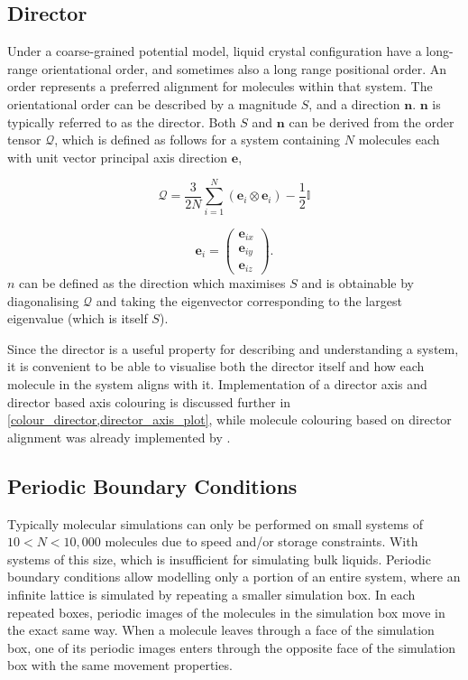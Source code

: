 \subsection{Director}
\label{director_explain}
Under a coarse-grained potential model, liquid crystal configuration have a long-range orientational order, and sometimes also a long range positional order. An order represents a preferred alignment for molecules within that system\cite{dong1997orientational}. The orientational order can be described by a magnitude $S$, and a direction $\mathbf{n}$. $\mathbf{n}$ is typically referred to as the director. Both $S$ and $\mathbf{n}$ can be derived from the order tensor $\mathcal{Q}$, which is defined as follows for a system containing $N$ molecules each with unit vector principal axis direction $\mathbf{e}$,

\begin{equation}
\mathcal{Q}=
\frac{3}{2N}
\sum_{i=1}^{N}
(\mathbf{e}_i
\otimes
\mathbf{e}_i)
-\frac{1}{2}\mathbb{I}
\end{equation}

\begin{equation}
\mathbf{e}_i=\begin{pmatrix}
  \mathbf{e}_{ix}\\
  \mathbf{e}_{iy}\\
  \mathbf{e}_{iz}
\end{pmatrix}.
\label{order_tensor_e}
\end{equation}
$n$ can be defined as the direction which maximises $S$ and is obtainable by diagonalising $\mathcal{Q}$ and taking the eigenvector corresponding to the largest eigenvalue (which is itself $S$).

Since the director is a useful property for describing and understanding a system, it is convenient to be able to visualise both the director itself and how each molecule in the system aligns with it. Implementation of a director axis and director based axis colouring is discussed further in \cref{colour_director,director_axis_plot}, while molecule colouring based on director alignment was already implemented by \textcite{Battistini_2021}.

\subsection{Periodic Boundary Conditions}
\label{pbc_explain}
Typically molecular simulations can only be performed on small systems of $10<N<10,000$ molecules due to speed and/or storage constraints. With systems of this size, which is insufficient for simulating bulk liquids. Periodic boundary conditions allow modelling only a portion of an entire system\cite{gabriel2008molecular}, where an infinite lattice is simulated by repeating a smaller simulation box\cite{wu2014applying}. In each repeated boxes, periodic images of the molecules in the simulation box move in the exact same way. When a molecule leaves through a face of the simulation box, one of its periodic images enters through the opposite face of the simulation box with the same movement properties.

